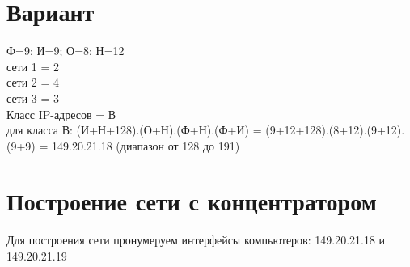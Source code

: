 \documentclass{article}
\begin{document}
\section*{Вариант}

Ф=9; И=9; О=8; Н=12
\\ 
сети 1 = 2
\\
сети 2 = 4
\\
сети 3 = 3
\\
Класс IP-адресов = В
\\
для класса В:
(И+Н+128).(О+Н).(Ф+Н).(Ф+И) = (9+12+128).(8+12).(9+12).(9+9) = 149.20.21.18 (диапазон от 128 до 191)

\section{Построение сети с концентратором}

Для построения сети пронумеруем интерфейсы компьютеров: 149.20.21.18 и 149.20.21.19
\end{document}
